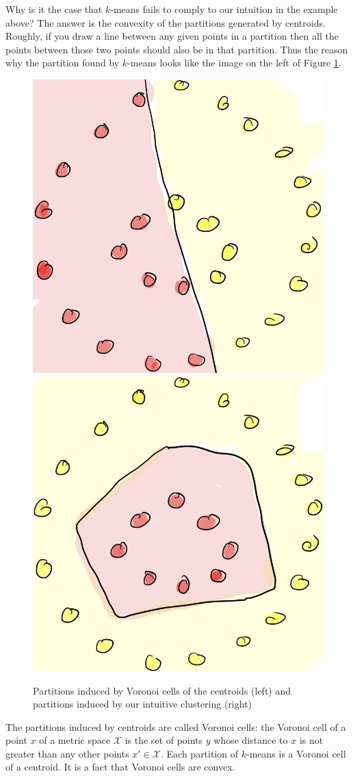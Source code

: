 Why is it the case that $k$-means fails to comply to our intuition in the example
above? The answer is the convexity of the partitions generated by centroids. Roughly,
if you draw a line between any given points in a partition then all the points
between those two points should also be in that partition. Thus the reason
why the partition found by $k$-means looks like the image on the left of
Figure \ref{fig:partition}.

\begin{figure}
\begin{center}
\includegraphics[width=.49\linewidth]{chapter_2/files/voronoi-cell.jpg}
\includegraphics[width=.49\linewidth]{chapter_2/files/intuition-cell.jpg}
\end{center}
\caption{Partitions induced by Voronoi cells of the centroids (left) and
partitions induced by our intuitive clustering (right)}
\label{fig:partition}
\end{figure}

The partitions induced by centroids are called Voronoi cells: the Voronoi
cell of a point $x$ of a metric space $\mathcal{X}$ is the set of points
$y$ whose distance to $x$ is not greater than any other points $x' \in \mathcal{X}$.
Each partition of $k$-means is a Voronoi cell of a centroid. It is a fact that
Voronoi cells are convex.


